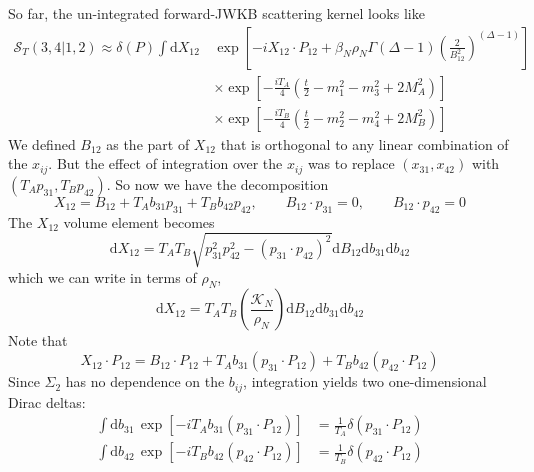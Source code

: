 So far, the un-integrated forward-JWKB scattering kernel looks like
\begin{equation}
\begin{split}
	\mathcal{S}_{T}(3,4|1,2) \approx \delta(P) \int \mathrm{d}X_{12} \, {}& \exp{\left[-i X_{12} \cdot P_{12} + \beta_{N} \rho_{N} \Gamma(\Delta - 1) \left( \frac{2}{B_{1 2}^{2}} \right)^{(\Delta - 1)} \right]} \\
	&\times \exp{\left[ -\frac{i T_{A}}{4} \left( \frac{t}{2} -m_{1}^{2} - m_{3}^{2} + 2 M_{A}^{2} \right) \right]} \\
	&\times \exp{\left[ -\frac{i T_{B}}{4} \left( \frac{t}{2} -m_{2}^{2} - m_{4}^{2} + 2 M_{B}^{2} \right) \right]}
\end{split} \label{STTX12}
\end{equation}
We defined $B_{12}$ as the part of $X_{12}$ that is orthogonal to any linear combination of the $x_{ij}$. But the effect of integration over the $x_{ij}$ was to replace $(x_{31}, x_{42})$ with $(T_{A} p_{31}, T_{B} p_{42})$. So now we have the decomposition
\begin{equation}
	X_{12} = B_{12} + T_{A} b_{31} p_{31} + T_{B} b_{42} p_{42}, \qquad B_{12} \cdot p_{31} = 0, \qquad B_{12} \cdot p_{42} = 0
\end{equation}
The $X_{12}$ volume element becomes
\begin{equation}
	\mathrm{d}X_{12} = T_{A} T_{B} \sqrt{p_{31}^{2} p_{42}^{2} - (p_{31} \cdot p_{42})^{2}} \mathrm{d}B_{12} \mathrm{d}b_{31} \mathrm{d}b_{42}
\end{equation}
which we can write in terms of $\rho_{N}$,
\begin{equation}
	\mathrm{d}X_{12} = T_{A} T_{B} \left( \frac{\mathcal{K}_{N}}{\rho_{N}} \right) \mathrm{d}B_{12} \mathrm{d}b_{31} \mathrm{d}b_{42}
\end{equation}
Note that
\begin{equation}
	X_{12} \cdot P_{12} = B_{12} \cdot P_{12} + T_{A} b_{31} (p_{31} \cdot P_{12}) + T_{B} b_{42} (p_{42} \cdot P_{12})
\end{equation}
Since $\Sigma_{2}$ has no dependence on the $b_{ij}$, integration yields two one-dimensional Dirac deltas:
\begin{align}
	\int \mathrm{d}b_{31} \, \exp{\left[- i T_{A} b_{31} (p_{31} \cdot P_{12}) \right]} &= \frac{1}{T_{A}} \delta(p_{31} \cdot P_{12}) \\
	\int \mathrm{d}b_{42} \, \exp{\left[- i T_{B} b_{42} (p_{42} \cdot P_{12}) \right]} &= \frac{1}{T_{B}} \delta(p_{42} \cdot P_{12})
\end{align}
